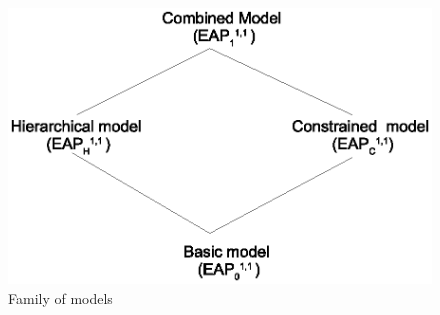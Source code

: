 	\begin{figure}
		\centering
		\includegraphics[width=.7\textwidth]{ABAC16/labac-family}
		\caption{Family of \eapABAC{} models}
		\label{fig:labac-family}
	\end{figure}
	